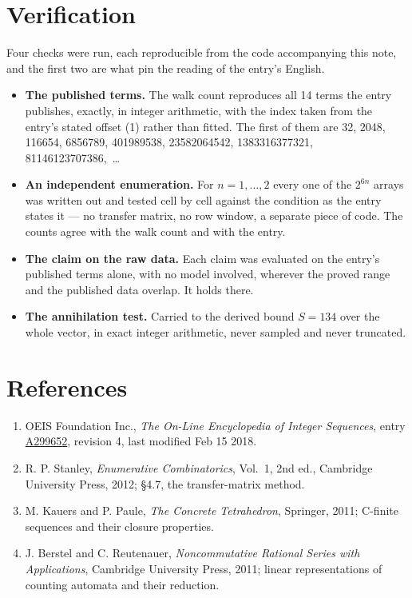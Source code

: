 \documentclass[11pt]{article}
\theoremstyle{definition}
\begin{document}
\section{Verification}

Four checks were run, each reproducible from the code accompanying this note, and the first two are what pin the reading of the entry's English.

\begin{itemize}

\item {\bfseries The published terms.} The walk count reproduces all 14 terms the entry publishes, exactly, in integer arithmetic, with the index taken from the entry's stated offset (1) rather than fitted. The first of them are 32, 2048, 116654, 6856789, 401989538, 23582064542, 1383316377321, 81146123707386,~\dots

\item {\bfseries An independent enumeration.} For $n = 1,\dots,2$ every one of the $2^{6n}$ arrays was written out and tested cell by cell against the condition as the entry states it --- no transfer matrix, no row window, a separate piece of code. The counts agree with the walk count and with the entry.

\item {\bfseries The claim on the raw data.} Each claim was evaluated on the entry's published terms alone, with no model involved, wherever the proved range and the published data overlap. It holds there.

\item {\bfseries The annihilation test.} Carried to the derived bound $S = 134$ over the whole vector, in exact integer arithmetic, never sampled and never truncated.

\end{itemize}

\section{References}

\begin{enumerate}

\item OEIS Foundation Inc., \emph{The On-Line Encyclopedia of Integer Sequences}, entry \href{https://oeis.org/A299652}{A299652}, revision 4, last modified Feb 15 2018.

\item R. P. Stanley, \emph{Enumerative Combinatorics}, Vol.~1, 2nd ed., Cambridge University Press, 2012; \S4.7, the transfer-matrix method.

\item M. Kauers and P. Paule, \emph{The Concrete Tetrahedron}, Springer, 2011; C-finite sequences and their closure properties.

\item J. Berstel and C. Reutenauer, \emph{Noncommutative Rational Series with Applications}, Cambridge University Press, 2011; linear representations of counting automata and their reduction.

\end{enumerate}
\end{document}
